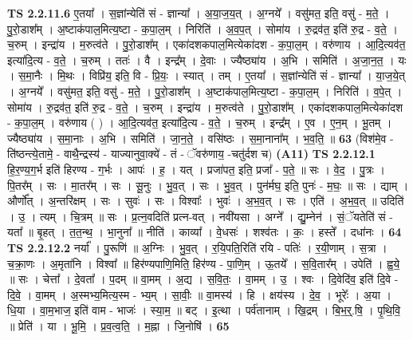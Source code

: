 \documentclass[17pt]{extarticle}
\begin{document}
                  \newline
                                \textbf{ TS 2.2.11.6} \newline
                  ए॒तया᳚ । स॒ज्ञांन्येति॑ सं - ज्ञान्या᳚ । अ॒या॒ज॒य॒त् । अ॒ग्नये᳚ । वसु॑मत॒ इति॒ वसु॑ - म॒ते॒ । पु॒रो॒डाश᳚म् । अ॒ष्टाक॑पाल॒मित्य॒ष्टा - क॒पा॒ल॒म् । निरिति॑ । अ॒व॒प॒त् । सोमा॑य । रु॒द्रव॑त॒ इति॑ रु॒द्र - व॒ते॒ । च॒रुम् । इन्द्रा॑य । म॒रुत्व॑ते । पु॒रो॒डाश᳚म् । एका॑दशकपाल॒मित्येका॑दश - क॒पा॒ल॒म् । वरु॑णाय । आ॒दि॒त्यव॑त॒ इत्या॑दि॒त्य - व॒ते॒ । च॒रुम् । ततः॑ । वै । इन्द्र᳚म् । दे॒वाः । ज्यैष्ठ्या॑य । अ॒भि । समिति॑ । अ॒जा॒न॒त॒ । यः । स॒मा॒नैः । मि॒थः । विप्रि॑य॒ इति॒ वि - प्रि॒यः॒ । स्यात् । तम् । ए॒तया᳚ । स॒ज्ञांन्येति॑ सं - ज्ञान्या᳚ । या॒ज॒ये॒त् । अ॒ग्नये᳚ । वसु॑मत॒ इति॒ वसु॑ - म॒ते॒ । पु॒रो॒डाश᳚म् । अ॒ष्टाक॑पाल॒मित्य॒ष्टा - क॒पा॒ल॒म् । निरिति॑ । व॒पे॒त् । सोमा॑य । रु॒द्रव॑त॒ इति॑ रु॒द्र - व॒ते॒ । च॒रुम् । इन्द्रा॑य । म॒रुत्व॑ते । पु॒रो॒डाश᳚म् । एका॑दशकपाल॒मित्येका॑दश - क॒पा॒ल॒म् । वरु॑णाय ( ) । आ॒दि॒त्यव॑त॒ इत्या॑दि॒त्य - व॒ते॒ । च॒रुम् । इन्द्र᳚म् । ए॒व । ए॒न॒म् । भू॒तम् । ज्यैष्ठ्या॑य । स॒मा॒नाः । अ॒भि । समिति॑ । जा॒न॒ते॒ । वसि॑ष्ठः । स॒मा॒नाना᳚म् । भ॒व॒ति॒ ॥ \textbf{  63} \newline
                  \newline
                      (विश॑मे॒व - ति॑ष्ठन्त्ये॒तामे॒ - वाथै॒न्द्रस्य॑ - याज्यानुवा॒क्ये॑ - तं - ॅवरु॑णाय॒ -चतु॑र्दश च)  \textbf{(A11)} \newline \newline
                                \textbf{ TS 2.2.12.1} \newline
                  हि॒र॒ण्य॒ग॒र्भ इति॑ हिरण्य - ग॒र्भः । आपः॑ । ह॒ । यत् । प्रजा॑पत॒ इति॒ प्रजा᳚ - प॒ते॒ ॥ सः । वे॒द॒ । पु॒त्रः । पि॒तर᳚म् । सः । मा॒तर᳚म् । सः । सू॒नुः । भु॒व॒त् । सः । भु॒व॒त् । पुन॑र्मघ॒ इति॒ पुनः॑ - म॒घः॒ ॥ सः । द्याम् । और्णो᳚त् । अ॒न्तरि॑क्षम् । सः । सुवः॑ । सः । विश्वाः᳚ । भुवः॑ । अ॒भ॒व॒त् । सः । एति॑ । अ॒भ॒व॒त् ॥ उदिति॑ । उ॒ । त्यम् । चि॒त्रम् ॥ सः । प्र॒त्न॒वदिति॑ प्रत्न-वत् । नवी॑यसा । अग्ने᳚ । द्यु॒म्नेन॑ । सं॒ॅयतेति॑ सं - यता᳚ ॥ बृ॒हत् । त॒त॒न्थ॒ । भा॒नुना᳚ ॥ नीति॑ । काव्या᳚ । वे॒धसः॑ । शश्व॑तः । कः॒ । हस्ते᳚ । दधा॑नः । \textbf{  64} \newline
                  \newline
                                \textbf{ TS 2.2.12.2} \newline
                  नर्या᳚ । पु॒रूणि॑ ॥ अ॒ग्निः । भु॒व॒त् । र॒यि॒पति॒रिति॑ रयि - पतिः॑ । र॒यी॒णाम् । स॒त्रा । च॒क्रा॒णः । अ॒मृता॑नि । विश्वा᳚ ॥ हिर॑ण्यपाणि॒मिति॒ हिर॑ण्य - पा॒णि॒म् । ऊ॒तये᳚ । स॒वि॒तार᳚म् । उपेति॑ । ह्व॒ये॒ ॥ सः । चेत्ता᳚ । दे॒वता᳚ । प॒दम् ॥ वा॒मम् । अ॒द्य । स॒वि॒तः॒ । वा॒मम् । उ॒ । श्वः । दि॒वेदि॑व॒ इति॑ दि॒वे - दि॒वे॒ । वा॒मम् । अ॒स्मभ्य॒मित्य॒स्म - भ्य॒म् । सा॒वीः॒ ॥ वा॒मस्य॑ । हि । क्षय॑स्य । दे॒व॒ । भूरेः᳚ । अ॒या । धि॒या । वा॒म॒भाज॒ इति॑ वाम - भाजः॑ । स्या॒म॒ ॥ बट् । इ॒त्था । पर्व॑तानाम् । खि॒द्रम् । बि॒भ॒र्॒.षि॒ । पृ॒थि॒वि॒ ॥ प्रेति॑ । या । भू॒मि॒ । प्र॒व॒त्व॒ति॒ । म॒ह्ना । जि॒नोषि॑ । \textbf{  65} \newline
\end{document}
